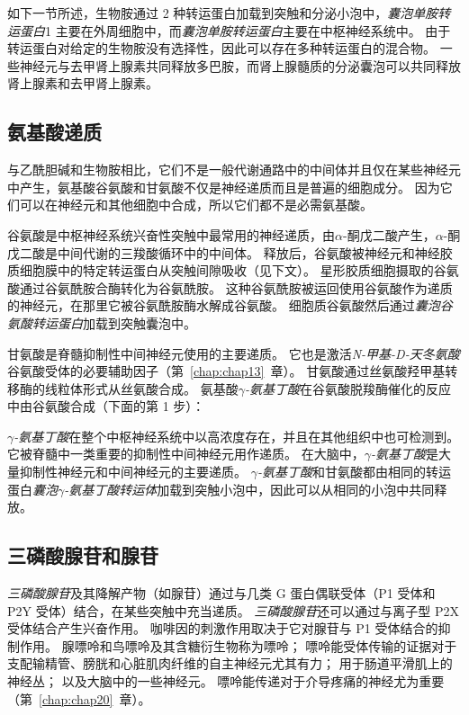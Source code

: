如下一节所述，生物胺通过 2 种转运蛋白加载到突触和分泌小泡中，\textit{囊泡单胺转运蛋白}1 主要在外周细胞中，而\textit{囊泡单胺转运蛋白}主要在中枢神经系统中。
由于转运蛋白对给定的生物胺没有选择性，因此可以存在多种转运蛋白的混合物。
一些神经元与去甲肾上腺素共同释放多巴胺，而肾上腺髓质的分泌囊泡可以共同释放肾上腺素和去甲肾上腺素。



\subsection{氨基酸递质}

与乙酰胆碱和生物胺相比，它们不是一般代谢通路中的中间体并且仅在某些神经元中产生，氨基酸谷氨酸和甘氨酸不仅是神经递质而且是普遍的细胞成分。
因为它们可以在神经元和其他细胞中合成，所以它们都不是必需氨基酸。


谷氨酸是中枢神经系统兴奋性突触中最常用的神经递质，由$\alpha$-酮戊二酸产生，$\alpha$-酮戊二酸是中间代谢的三羧酸循环中的中间体。
释放后，谷氨酸被神经元和神经胶质细胞膜中的特定转运蛋白从突触间隙吸收（见下文）。
星形胶质细胞摄取的谷氨酸通过谷氨酰胺合酶转化为谷氨酰胺。
这种谷氨酰胺被运回使用谷氨酸作为递质的神经元，在那里它被谷氨酰胺酶水解成谷氨酸。
细胞质谷氨酸然后通过\textit{囊泡谷氨酸转运蛋白}加载到突触囊泡中。


甘氨酸是脊髓抑制性中间神经元使用的主要递质。
它也是激活\textit{N-甲基-D-天冬氨酸}谷氨酸受体的必要辅助因子（第~\ref{chap:chap13}~章）。
甘氨酸通过丝氨酸羟甲基转移酶的线粒体形式从丝氨酸合成。
氨基酸\textit{$\gamma$-氨基丁酸}在谷氨酸脱羧酶催化的反应中由谷氨酸合成（下面的第 1 步）：


\textit{$\gamma$-氨基丁酸}在整个中枢神经系统中以高浓度存在，并且在其他组织中也可检测到。
它被脊髓中一类重要的抑制性中间神经元用作递质。
在大脑中，\textit{$\gamma$-氨基丁酸}是大量抑制性神经元和中间神经元的主要递质。
\textit{$\gamma$-氨基丁酸}和甘氨酸都由相同的转运蛋白\textit{囊泡$\gamma$-氨基丁酸转运体}加载到突触小泡中，因此可以从相同的小泡中共同释放。



\subsection{三磷酸腺苷和腺苷}

\textit{三磷酸腺苷}及其降解产物（如腺苷）通过与几类 G 蛋白偶联受体（P1 受体和 P2Y 受体）结合，在某些突触中充当递质。
\textit{三磷酸腺苷}还可以通过与离子型 P2X 受体结合产生兴奋作用。
咖啡因的刺激作用取决于它对腺苷与 P1 受体结合的抑制作用。
腺嘌呤和鸟嘌呤及其含糖衍生物称为嘌呤；
嘌呤能受体传输的证据对于支配输精管、膀胱和心脏肌肉纤维的自主神经元尤其有力；
用于肠道平滑肌上的神经丛；
以及大脑中的一些神经元。
嘌呤能传递对于介导疼痛的神经尤为重要（第~\ref{chap:chap20}~章）。


